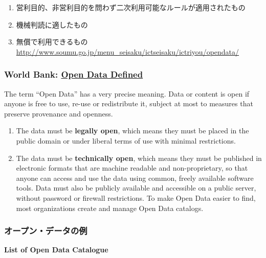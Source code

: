 \documentclass[
]{book}
\providecommand{\tightlist}{%
  \setlength{\itemsep}{0pt}\setlength{\parskip}{0pt}}
\theoremstyle{definition}
\theoremstyle{definition}
\theoremstyle{definition}
\theoremstyle{definition}
\theoremstyle{remark}
\begin{document}
\begin{enumerate}
\def\labelenumi{\arabic{enumi}.}
\tightlist
\item
  営利目的、非営利目的を問わず二次利用可能なルールが適用されたもの
\item
  機械判読に適したもの
\item
  無償で利用できるもの
  \url{http://www.soumu.go.jp/menu_seisaku/ictseisaku/ictriyou/opendata/}
\end{enumerate}

\hypertarget{world-bank-open-data-defined}{%
\subsubsection{\texorpdfstring{World Bank: \href{http://opendatatoolkit.worldbank.org}{Open Data Defined}}{World Bank: Open Data Defined}}\label{world-bank-open-data-defined}}

The term ``Open Data'' has a very precise meaning. Data or content is open if anyone is free to use, re-use or redistribute it, subject at most to measures that preserve provenance and openness.

\begin{enumerate}
\def\labelenumi{\arabic{enumi}.}
\item
  The data must be \textbf{legally open}, which means they must be placed in the public domain or under liberal terms of use with minimal restrictions.
\item
  The data must be \textbf{technically open}, which means they must be published in electronic formats that are machine readable and non-proprietary, so that anyone can access and use the data using common, freely available software tools. Data must also be publicly available and accessible on a public server, without password or firewall restrictions. To make Open Data easier to find, most organizations create and manage Open Data catalogs.
\end{enumerate}

\hypertarget{ux30aaux30fcux30d7ux30f3ux30c7ux30fcux30bfux306eux4f8b}{%
\subsubsection{オープン・データの例}\label{ux30aaux30fcux30d7ux30f3ux30c7ux30fcux30bfux306eux4f8b}}

\textbf{List of Open Data Catalogue}
\end{document}
